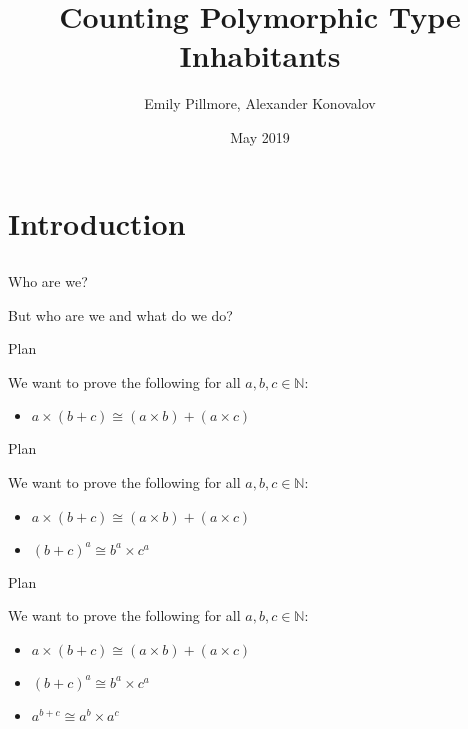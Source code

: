 \documentclass[tikz]{beamer}
\title{Counting Polymorphic Type Inhabitants}
\author{Emily Pillmore, Alexander Konovalov}
\date{May 2019}
\theoremstyle{definition}
\begin{document}
\maketitle

\section{Introduction}
\subsection{}

\begin{frame}{Who are we?}

But who are we and what do we do?

\end{frame}

\begin{frame}{Plan}

We want to prove the following for all $a, b, c \in \mathbb{N}$:

\begin{itemize}
    \item $a \times (b + c) \cong (a \times b) + (a \times c)$
\end{itemize}

\end{frame}

\begin{frame}{Plan}

We want to prove the following for all $a, b, c \in \mathbb{N}$:

\begin{itemize}
    \item $a \times (b + c) \cong (a \times b) + (a \times c)$
    \item $(b + c)^a \cong b^a \times c^a$
\end{itemize}

\end{frame}

\begin{frame}{Plan}

We want to prove the following for all $a, b, c \in \mathbb{N}$:

\begin{itemize}
    \item $a \times (b + c) \cong (a \times b) + (a \times c)$
    \item $(b + c)^a \cong b^a \times c^a$
    \item $a^{b + c} \cong a^b \times a^c$
\end{itemize}
\end{frame}
\end{document}

